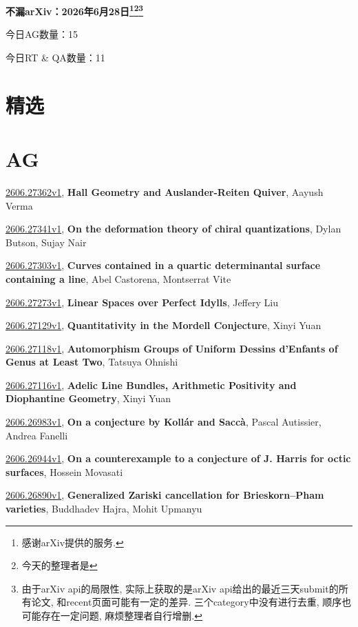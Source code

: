 \documentclass[9pt, a4paper]{article}
\theoremstyle{plain}
\theoremstyle{definition}
\theoremstyle{remark}
\newcommand{\arxiv}[3]{\href{https://arxiv.org/abs/#1}{#1}, \textbf{\textcolor{arxivblue}{#2}}, #3}
\newcommand{\AGnumber}{15}
\newcommand{\RTQAnumber}{11}
\newcommand{\NewestDate}{2026年6月28日}
\newcommand{\todayarXiver}{} %
\begin{document}
\begin{center}
    \Huge\textbf{不漏arXiv：\NewestDate\footnote{感谢arXiv提供的服务.}\footnote{今天的整理者是\todayarXiver}\footnote{由于arXiv api的局限性, 实际上获取的是arXiv api给出的最近三天submit的所有论文, 和recent页面可能有一定的差异. 三个category中没有进行去重, 顺序也可能存在一定问题, 麻烦整理者自行增删.}} \\
\end{center}

\setcounter{section}{-1}

\begin{center}
    今日AG数量：\AGnumber
    
    今日RT \& QA数量：\RTQAnumber
    
\end{center}


\section{精选}


\section{AG}
\arxiv{2606.27362v1}{Hall Geometry and Auslander-Reiten Quiver}{Aayush Verma}

\arxiv{2606.27341v1}{On the deformation theory of chiral quantizations}{Dylan Butson, Sujay Nair}

\arxiv{2606.27303v1}{Curves contained in a quartic determinantal surface containing a line}{Abel Castorena, Montserrat Vite}

\arxiv{2606.27273v1}{Linear Spaces over Perfect Idylls}{Jeffery Liu}

\arxiv{2606.27129v1}{Quantitativity in the Mordell Conjecture}{Xinyi Yuan}

\arxiv{2606.27118v1}{Automorphism Groups of Uniform Dessins d'Enfants of Genus at Least Two}{Tatsuya Ohnishi}

\arxiv{2606.27116v1}{Adelic Line Bundles, Arithmetic Positivity and Diophantine Geometry}{Xinyi Yuan}

\arxiv{2606.26983v1}{On a conjecture by Kollár and Saccà}{Pascal Autissier, Andrea Fanelli}

\arxiv{2606.26944v1}{On a counterexample to a conjecture of J. Harris for octic surfaces}{Hossein Movasati}

\arxiv{2606.26890v1}{Generalized Zariski cancellation for Brieskorn--Pham varieties}{Buddhadev Hajra, Mohit Upmanyu}
\end{document}
